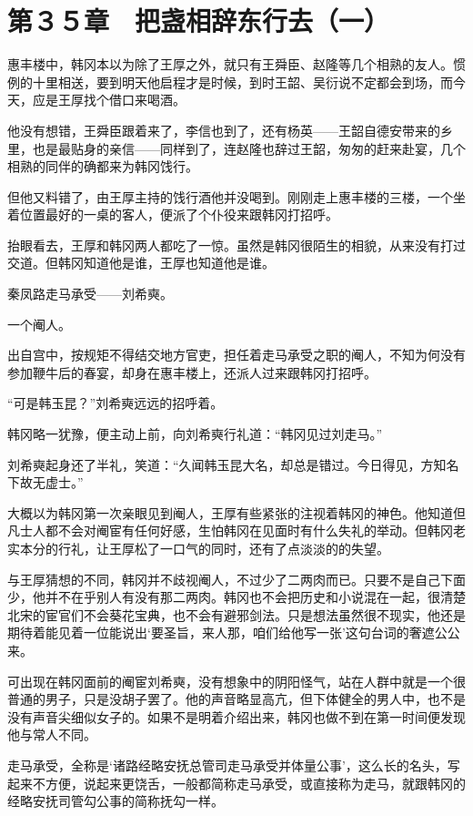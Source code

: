 \section{第３５章　把盏相辞东行去（一）}

惠丰楼中，韩冈本以为除了王厚之外，就只有王舜臣、赵隆等几个相熟的友人。惯例的十里相送，要到明天他启程才是时候，到时王韶、吴衍说不定都会到场，而今天，应是王厚找个借口来喝酒。

他没有想错，王舜臣跟着来了，李信也到了，还有杨英——王韶自德安带来的乡里，也是最贴身的亲信——同样到了，连赵隆也辞过王韶，匆匆的赶来赴宴，几个相熟的同伴的确都来为韩冈饯行。

但他又料错了，由王厚主持的饯行酒他并没喝到。刚刚走上惠丰楼的三楼，一个坐着位置最好的一桌的客人，便派了个仆役来跟韩冈打招呼。

抬眼看去，王厚和韩冈两人都吃了一惊。虽然是韩冈很陌生的相貌，从来没有打过交道。但韩冈知道他是谁，王厚也知道他是谁。

秦凤路走马承受——刘希奭。

一个阉人。

出自宫中，按规矩不得结交地方官吏，担任着走马承受之职的阉人，不知为何没有参加鞭牛后的春宴，却身在惠丰楼上，还派人过来跟韩冈打招呼。

“可是韩玉昆？”刘希奭远远的招呼着。

韩冈略一犹豫，便主动上前，向刘希奭行礼道：“韩冈见过刘走马。”

刘希奭起身还了半礼，笑道：“久闻韩玉昆大名，却总是错过。今日得见，方知名下故无虚士。”

大概以为韩冈第一次亲眼见到阉人，王厚有些紧张的注视着韩冈的神色。他知道但凡士人都不会对阉宦有任何好感，生怕韩冈在见面时有什么失礼的举动。但韩冈老实本分的行礼，让王厚松了一口气的同时，还有了点淡淡的的失望。

与王厚猜想的不同，韩冈并不歧视阉人，不过少了二两肉而已。只要不是自己下面少，他并不在乎别人有没有那二两肉。韩冈也不会把历史和小说混在一起，很清楚北宋的宦官们不会葵花宝典，也不会有避邪剑法。只是想法虽然很不现实，他还是期待着能见着一位能说出‘要圣旨，来人那，咱们给他写一张’这句台词的奢遮公公来。

可出现在韩冈面前的阉宦刘希奭，没有想象中的阴阳怪气，站在人群中就是一个很普通的男子，只是没胡子罢了。他的声音略显高亢，但下体健全的男人中，也不是没有声音尖细似女子的。如果不是明着介绍出来，韩冈也做不到在第一时间便发现他与常人不同。

走马承受，全称是‘诸路经略安抚总管司走马承受并体量公事’，这么长的名头，写起来不方便，说起来更饶舌，一般都简称走马承受，或直接称为走马，就跟韩冈的经略安抚司管勾公事的简称抚勾一样。

